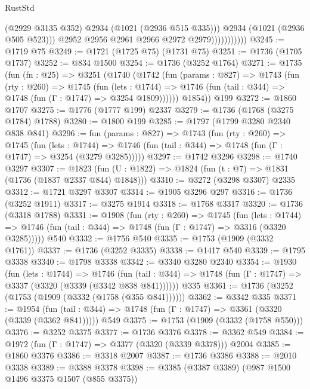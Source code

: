 \begin{lexlean}{RustStd}
\begin{coremodule}
                              (@2929 @3135 @352)
                              @2934
                              (@1021 (@2936 @515 @335)))
                            @2934
                            (@1021 (@2936 @505 @523)))
                          @2952
                          @2956
                          @2961
                          @2966
                          @2972
                          @2979)))))))))))
@3245 := @1719 @75
@3249 := @1721 (@1725 @75) (@1731 @75)
@3251 := @1736 (@1705 @1737)
@3252 := @834 @1500
@3254 := @1736 (@3252 @1764)
@3271 := @1735
    (fun (fn : @25) =>
    @3251
      (@1740
        (@1742
          (fun (params : @827) =>
          @1743
            (fun (rty : @260) =>
            @1745
              (fun (lets : @1744) =>
              @1746 (fun (tail : @344) => @1748 (fun (Γ : @1747) => @3254 @1809))))))
        @1854))
    @199
@3272 := @1860 @1707
@3275 := @1776 (@1777 @199) @2337
@3279 := @1736 (@1768 (@3275 @1784) @1788)
@3280 := @1800 @199
@3285 := @1797 (@1799 @3280 @2340 @838 @841)
@3296 := fun (params : @827) =>
  @1743
    (fun (rty : @260) =>
    @1745
      (fun (lets : @1744) =>
      @1746 (fun (tail : @344) => @1748 (fun (Γ : @1747) => @3254 (@3279 @3285)))))
@3297 := @1742 @3296
@3298 := @1740 @3297
@3307 := @1823 (fun (U : @1822) => @1824 (fun (t : @7) => @1831 (@1736 (@1837 @2337 @844) @1848)))
@3310 := @3272 (@3298 @3307) @2335
@3312 := @1721 @3297 @3307
@3314 := @1905 @3296 @297
@3316 := @1736 (@3252 @1911)
@3317 := @3275 @1914
@3318 := @1768 @3317
@3320 := @1736 (@3318 @1788)
@3331 := @1908
    (fun (rty : @260) =>
    @1745
      (fun (lets : @1744) =>
      @1746 (fun (tail : @344) => @1748 (fun (Γ : @1747) => @3316 (@3320 @3285)))))
    @540
@3332 := @1756 @540
@3335 := @1753 (@1909 (@3332 @1761))
@3337 := @1736 (@3252 @3335)
@3338 := @1417 @540
@3339 := @1795 @3338
@3340 := @1798 @3338
@3342 := @3340 @3280 @2340
@3354 := @1930
    (fun (lets : @1744) =>
    @1746 (fun (tail : @344) => @1748 (fun (Γ : @1747) => @3337 (@3320 (@3339 (@3342 @838 @841))))))
    @335
@3361 := @1736 (@3252 (@1753 (@1909 (@3332 (@1758 (@355 @841))))))
@3362 := @3342 @335
@3371 := @1954
    (fun (tail : @344) => @1748 (fun (Γ : @1747) => @3361 (@3320 (@3339 (@3362 @841)))))
    @549
@3375 := @1753 (@1909 (@3332 (@1758 @550)))
@3376 := @3252 @3375
@3377 := @1736 @3376
@3378 := @3362 @549
@3384 := @1972 (fun (Γ : @1747) => @3377 (@3320 (@3339 @3378))) @2004
@3385 := @1860 @3376
@3386 := @3318 @2007
@3387 := @1736 @3386
@3388 := @2010 @3338
@3389 := @3388 @3378
@3398 := @3385 (@3387 @3389) (@987 @1500 @1496 @3375 @1507 (@855 @3375))

\end{coremodule}
\end{lexlean}
